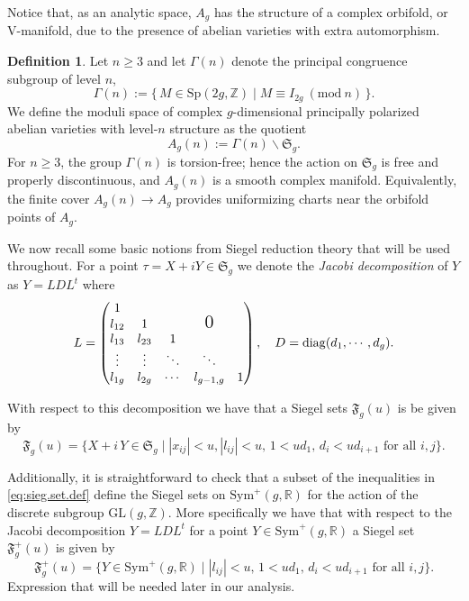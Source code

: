 \documentclass[11pt]{amsart}
\theoremstyle{plain}
\theoremstyle{definition}
\newtheorem{definition}[theorem]{Definition}
\theoremstyle{remark}
\newcommand{\R}{\mathbb R}
\newcommand{\Z}{\mathbb{Z}}
\newcommand{\fS}{\mathfrak{S}}
\newcommand{\sym}{\mathrm{Sym}^{\!+}}
\newcommand{\Sp}{\mathrm{Sp}}
\newcommand{\fF}{\mathfrak{F}}
\begin{document}
Notice that, as an analytic space, $A_g$ has the structure of a complex orbifold, or V-manifold, due to the presence of abelian varieties with extra automorphism.  

\begin{definition}
Let $n\ge 3$ and let $\Gamma(n)$ denote the principal congruence subgroup of level $n$,
\begin{equation}
\Gamma(n):=\{\,M\in \Sp(2g,\Z)\mid M\equiv I_{2g}\ (\mathrm{mod}\ n)\,\}.
\end{equation}
We define the moduli space of complex $g$-dimensional principally polarized abelian varieties with level-$n$ structure as the quotient
\begin{equation}
A_g(n):=\Gamma(n)\backslash \fS_g .
\end{equation}
For $n\ge 3$, the group $\Gamma(n)$ is torsion-free; hence the action on $\fS_g$ is free and properly discontinuous, and $A_g(n)$ is a smooth complex manifold. Equivalently, the finite cover $A_g(n)\to A_g$ provides uniformizing charts near the orbifold points of $A_g$.
\end{definition}

We now recall some basic notions from Siegel reduction theory that will be used throughout. For a point $\tau=X+iY\in \fS_g$ we denote the \textit{Jacobi decomposition} of $Y$ as $Y=LDL^t$ where 
\[
L=\begin{pmatrix}
    1      &            &        &        & \\
    l_{12} & 1          &        & \text{\Large{0}}& \\
    l_{13} & l_{23}     & 1      &        & \\
    \vdots & \vdots     & \ddots & \ddots & \\
    l_{1g} & l_{2g}     & \cdots & l_{g-1,g} & 1
\end{pmatrix},\quad D=\mathrm{diag}(d_1,\cdots,d_g).
\]

With respect to this decomposition we have that a Siegel sets $\fF_g(u)$ is be given by
\begin{equation}
    \label{eq:sieg.set.def}
    \fF_g(u)=\{ X+ i\, Y \in \fS_g \mid |x_{ij}|<u, |l_{ij}|<u,\, 1<ud_1,\, d_i<ud_{i+1} \text{ for all } i,j  \}.
\end{equation}

Additionally, it is straightforward to check that a subset of the inequalities in \eqref{eq:sieg.set.def} define the Siegel sets  on $\sym(g,\R)$ for the action of the discrete subgroup $\mathrm{GL}(g,\Z)$. More specifically we have that with respect to the Jacobi decomposition $Y=LDL^t$ for a point $Y\in \sym(g,\R)$ a Siegel set $\fF_g^{+}(u)$ is given by
\begin{equation}
    \label{eq:sieg.set.sym}
    \fF^{+}_g(u)=\{Y \in \sym(g,\R) \mid  |l_{ij}|<u,\, 1<ud_1,\, d_i<ud_{i+1} \text{ for all } i,j  \}.
\end{equation}
Expression that will be needed later in our analysis.
\end{document}
